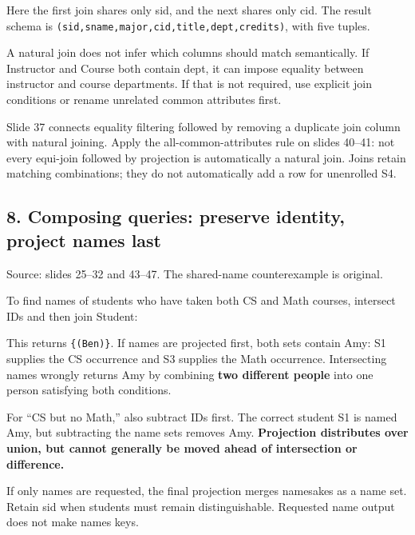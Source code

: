 Here the first join shares only sid, and the next shares only cid. The result schema is \texttt{(\allowbreak{}sid,\allowbreak{}sname,\allowbreak{}major,\allowbreak{}cid,\allowbreak{}title,\allowbreak{}dept,\allowbreak{}credits)\allowbreak{}}, with five tuples.

A natural join does not infer which columns should match semantically. If Instructor and Course both contain dept, it can impose equality between instructor and course departments. If that is not required, use explicit join conditions or rename unrelated common attributes first.

Slide 37 connects equality filtering followed by removing a duplicate join column with natural joining. Apply the all-common-attributes rule on slides 40--41: not every equi-join followed by projection is automatically a natural join. Joins retain matching combinations; they do not automatically add a row for unenrolled S4.

\subsection{8. Composing queries: preserve identity, project names last}\label{05_relational_algebra_en-composing-queries-preserve-identity-project-names-last}

Source: slides 25--32 and 43--47. The shared-name counterexample is original.

To find names of students who have taken both CS and Math courses, intersect IDs and then join Student:


This returns \texttt{\{(Ben)\}}. If names are projected first, both sets contain Amy: S1 supplies the CS occurrence and S3 supplies the Math occurrence. Intersecting names wrongly returns Amy by combining \textbf{two different people} into one person satisfying both conditions.

For ``CS but no Math,'' also subtract IDs first. The correct student S1 is named Amy, but subtracting the name sets removes Amy. \textbf{Projection distributes over union, but cannot generally be moved ahead of intersection or difference.}

If only names are requested, the final projection merges namesakes as a name set. Retain sid when students must remain distinguishable. Requested name output does not make names keys.

